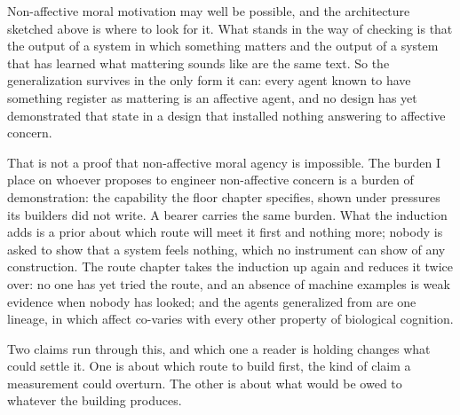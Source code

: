 Non-affective moral motivation may well be possible, and the architecture sketched above is where to look for it. What stands in the way of checking is that the output of a system in which something matters and the output of a system that has learned what mattering sounds like are the same text. So the generalization survives in the only form it can: every agent known to have something register as mattering is an affective agent, and no design has yet demonstrated that state in a design that installed nothing answering to affective concern.

That is not a proof that non-affective moral agency is impossible. The burden I place on whoever proposes to engineer non-affective concern is a burden of demonstration: the capability the floor chapter specifies, shown under pressures its builders did not write. A bearer carries the same burden. What the induction adds is a prior about which route will meet it first and nothing more; nobody is asked to show that a system feels nothing, which no instrument can show of any construction. The route chapter takes the induction up again and reduces it twice over: no one has yet tried the route, and an absence of machine examples is weak evidence when nobody has looked; and the agents generalized from are one lineage, in which affect co-varies with every other property of biological cognition.

Two claims run through this, and which one a reader is holding changes what could settle it. One is about which route to build first, the kind of claim a measurement could overturn. The other is about what would be owed to whatever the building produces.
